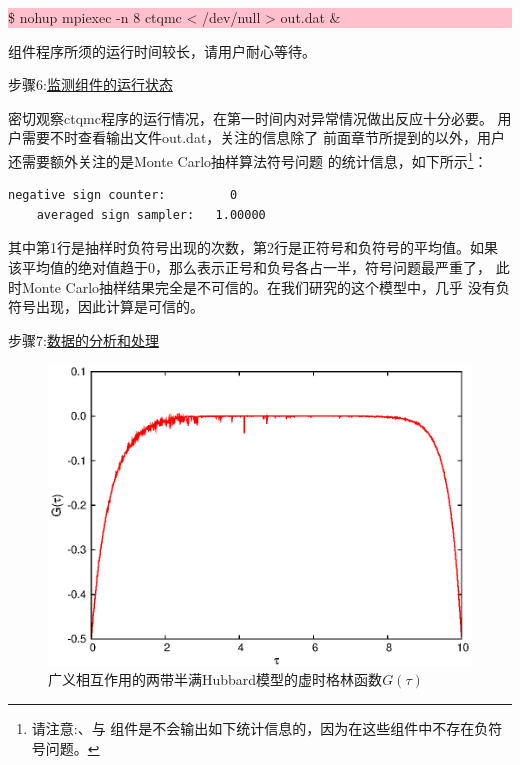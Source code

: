 \noindent\colorbox{pink}{\parbox[r]{\linewidth}{\quad \$ nohup mpiexec -n 8 ctqmc < /dev/null >  out.dat \&}}
{\begonia}组件程序所须的运行时间较长，请用户耐心等待。

步骤6:\underline{监测{\begonia}组件的运行状态}

密切观察ctqmc程序的运行情况，在第一时间内对异常情况做出反应十分必要。
用户需要不时查看输出文件out.dat，关注的信息除了
前面章节所提到的以外，用户还需要额外关注的是Monte Carlo抽样算法符号问题
的统计信息，如下所示\footnote{请注意:{\azalea}、{\gardenia}与{\narcissus}
组件是不会输出如下统计信息的，因为在这些组件中不存在负符号问题\cite{yoo:10307}。}：
\begin{lstlisting}[frame=single]
    negative sign counter:         0
    averaged sign sampler:   1.00000
\end{lstlisting}
其中第1行是抽样时负符号出现的次数，第2行是正符号和负符号的平均值。如果
该平均值的绝对值趋于0，那么表示正号和负号各占一半，符号问题最严重了，
此时Monte Carlo抽样结果完全是不可信的。在我们研究的这个模型中，几乎
没有负符号出现，因此计算是可信的。

步骤7:\underline{数据的分析和处理}

\begin{figure}
\centering
\includegraphics{figure/green-t821.eps}
\caption{广义相互作用的两带半满Hubbard模型的虚时格林函数$G(\tau)$} 
\label{fig:green-t821}
\end{figure}

